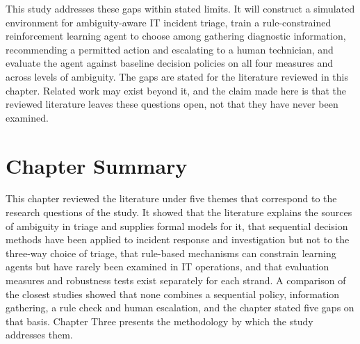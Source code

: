 \documentclass[12pt,a4paper]{article}
\begin{document}
This study addresses these gaps within stated limits. It will construct a simulated environment for ambiguity-aware IT incident triage, train a rule-constrained reinforcement learning agent to choose among gathering diagnostic information, recommending a permitted action and escalating to a human technician, and evaluate the agent against baseline decision policies on all four measures and across levels of ambiguity. The gaps are stated for the literature reviewed in this chapter. Related work may exist beyond it, and the claim made here is that the reviewed literature leaves these questions open, not that they have never been examined.

\section{Chapter Summary}

This chapter reviewed the literature under five themes that correspond to the research questions of the study. It showed that the literature explains the sources of ambiguity in triage and supplies formal models for it, that sequential decision methods have been applied to incident response and investigation but not to the three-way choice of triage, that rule-based mechanisms can constrain learning agents but have rarely been examined in IT operations, and that evaluation measures and robustness tests exist separately for each strand. A comparison of the closest studies showed that none combines a sequential policy, information gathering, a rule check and human escalation, and the chapter stated five gaps on that basis. Chapter Three presents the methodology by which the study addresses them.
\end{document}
